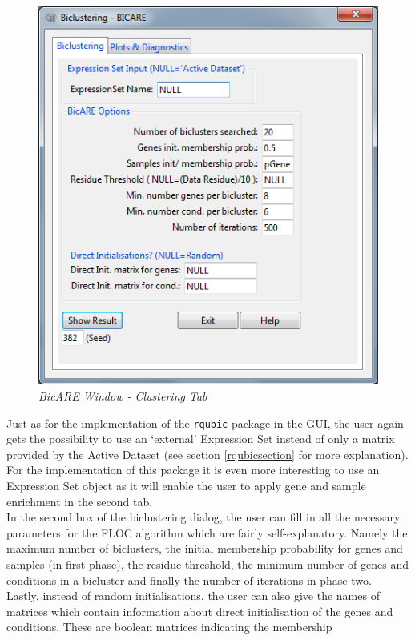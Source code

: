 \documentclass[a4paper]{article}\usepackage[]{graphicx}\usepackage[]{color}
\begin{document}
\begin{figure}[H]
\centering
\includegraphics[scale=0.5]{figures/bicare_clusttab.png}
\caption{{\it BicARE Window - Clustering Tab}\label{bicare_clusttab}}
\end{figure}
\noindent Just as for the implementation of the \verb|rqubic| package in the
GUI, the user again gets the possibility to use an `external' Expression Set
instead of only a matrix provided by the Active Dataset (see section \ref{rqubicsection} for
more explanation). For the implementation of this package it is even more
interesting to use an Expression Set object as it will enable the user to apply
gene and sample enrichment in the second tab.\\
In the second box of the biclustering dialog, the user can fill in all the
necessary parameters for the FLOC algorithm which are fairly self-explanatory.
Namely the maximum number of biclusters, the initial membership probability for
genes and samples (in first phase), the residue threshold, the minimum number of
genes and conditions in a bicluster and finally the number of iterations in
phase two.\\ Lastly, instead of random initialisations, the user can also give
the names of matrices which contain information about direct initialisation of
the genes and conditions. These are boolean matrices indicating the membership
\end{document}
